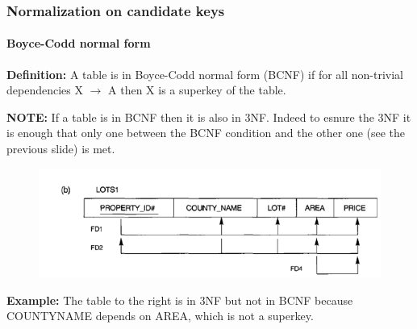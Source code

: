 \documentclass{beamer}
\newcommand{\fdep}[2]{#1 $\rightarrow$ #2}
\begin{document}
\begin{frame}
	\frametitle{Normalization on candidate keys}
	\framesubtitle{Boyce-Codd normal form}
	
	\textbf{Definition:} A table is in Boyce-Codd normal form (BCNF) if for all non-trivial dependencies \fdep{X}{A} then X is a superkey of the table.
	
	\textbf{NOTE:} If a table is in BCNF then it is also in 3NF. Indeed to esnure the 3NF it is enough that only one between the BCNF condition and the other one (see the previous slide) is met.
	
	\begin{figure}
		\begin{center}
			\includegraphics[scale=0.3]{img/normalization/norm13}
		\end{center}
	\end{figure}
	
	\textbf{Example:} The table to the right is in 3NF but not in BCNF because COUNTY\textunderscore NAME depends on AREA, which is not a superkey.
	
\end{frame}
\end{document}
